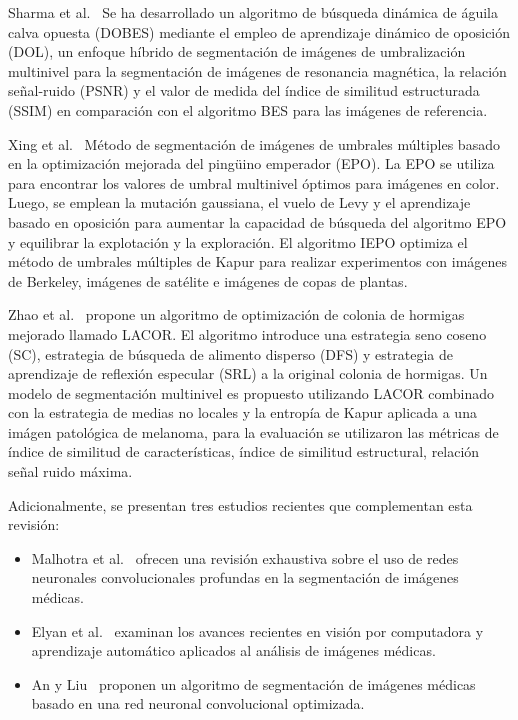 \documentclass[conference]{IEEEtran}
\begin{document}
\noindent Sharma et al.~\cite{Sharma2023} Se ha desarrollado un algoritmo de búsqueda dinámica de águila calva opuesta (DOBES) mediante el empleo de aprendizaje dinámico de oposición (DOL), un enfoque híbrido de segmentación de imágenes de umbralización multinivel para la segmentación de imágenes de resonancia magnética, la relación señal-ruido (PSNR) y el valor de medida del índice de similitud estructurada (SSIM) en comparación con el algoritmo BES para las imágenes de referencia.

\noindent Xing et al.~\cite{Xing2020} Método de segmentación de imágenes de umbrales múltiples basado en la optimización mejorada del pingüino emperador (EPO). La EPO se utiliza para encontrar los valores de umbral multinivel óptimos para imágenes en color. Luego, se emplean la mutación gaussiana, el vuelo de Levy y el aprendizaje basado en oposición para aumentar la capacidad de búsqueda del algoritmo EPO y equilibrar la explotación y la exploración. El algoritmo IEPO optimiza el método de umbrales múltiples de Kapur para realizar experimentos con imágenes de Berkeley, imágenes de satélite e imágenes de copas de plantas.

\noindent Zhao et al.~\cite{Zhao2023} propone un algoritmo de optimización de colonia de hormigas mejorado llamado LACOR. El algoritmo introduce una estrategia seno coseno (SC), estrategia de búsqueda de alimento disperso (DFS) y estrategia de aprendizaje de reflexión especular (SRL) a la original colonia de hormigas. Un modelo de segmentación multinivel es propuesto utilizando LACOR combinado con la estrategia de medias no locales y la entropía de Kapur aplicada a una imágen patológica de melanoma, para la evaluación se utilizaron las métricas de índice de similitud de características, índice de similitud estructural, relación señal ruido máxima.


\noindent Adicionalmente, se presentan tres estudios recientes que complementan esta revisión:

\begin{itemize}
    \item Malhotra et al.~\cite{Chakraborty2022} ofrecen una revisión exhaustiva sobre el uso de redes neuronales convolucionales profundas en la segmentación de imágenes médicas.
    \item Elyan et al.~\cite{Elyan2022} examinan los avances recientes en visión por computadora y aprendizaje automático aplicados al análisis de imágenes médicas.
    \item An y Liu~\cite{An2020} proponen un algoritmo de segmentación de imágenes médicas basado en una red neuronal convolucional optimizada.
\end{itemize}
\end{document}
